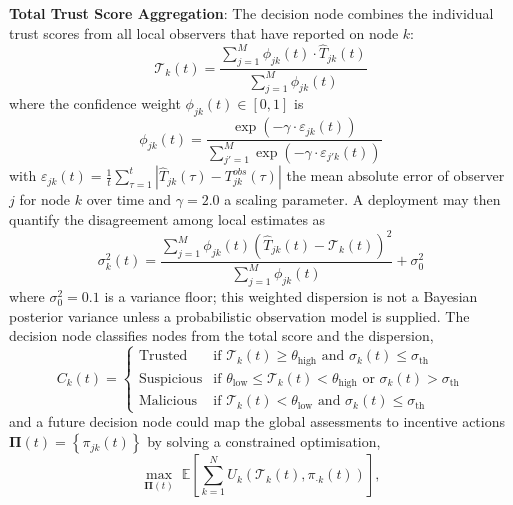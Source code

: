 \documentclass[notspecified,article,submit,moreauthors]{Definitions/mdpi}
\begin{document}
\textbf{Total Trust Score Aggregation}: The decision node combines the individual trust scores from all local observers that have reported on node $k$:
\begin{equation}\label{eq:ida_global}
\mathcal{T}_k(t) = \frac{\sum_{j=1}^{M} \phi_{jk}(t) \cdot \hat{T}_{jk}(t)}{\sum_{j=1}^{M} \phi_{jk}(t)}
\end{equation}
where the confidence weight $\phi_{jk}(t) \in [0, 1]$ is
\begin{equation}\label{eq:ida_weight}
\phi_{jk}(t) = \frac{\exp\left(-\gamma \cdot \varepsilon_{jk}(t)\right)}{\sum_{j'=1}^{M} \exp\left(-\gamma \cdot \varepsilon_{j'k}(t)\right)}
\end{equation}
with $\varepsilon_{jk}(t) = \frac{1}{t} \sum_{\tau=1}^{t} \left| \hat{T}_{jk}(\tau) - T_{jk}^{obs}(\tau) \right|$ the mean absolute error of observer $j$ for node $k$ over time and $\gamma = 2.0$ a scaling parameter. A deployment may then quantify the disagreement among local estimates as
\begin{equation}\label{eq:ida_uncertainty}
\sigma_k^2(t) = \frac{\sum_{j=1}^{M} \phi_{jk}(t) \left( \hat{T}_{jk}(t) - \mathcal{T}_k(t) \right)^2}{\sum_{j=1}^{M} \phi_{jk}(t)} + \sigma_0^2
\end{equation}
where $\sigma_0^2 = 0.1$ is a variance floor; this weighted dispersion is not a Bayesian posterior variance unless a probabilistic observation model is supplied. The decision node classifies nodes from the total score and the dispersion,
\begin{equation}\label{eq:ida_classification}
C_k(t) =
\begin{cases}
\text{Trusted} & \text{if } \mathcal{T}_k(t) \geq \theta_{\text{high}} \text{ and } \sigma_k(t) \leq \sigma_{\text{th}} \\
\text{Suspicious} & \text{if } \theta_{\text{low}} \leq \mathcal{T}_k(t) < \theta_{\text{high}} \text{ or } \sigma_k(t) > \sigma_{\text{th}} \\
\text{Malicious} & \text{if } \mathcal{T}_k(t) < \theta_{\text{low}} \text{ and } \sigma_k(t) \leq \sigma_{\text{th}}
\end{cases}
\end{equation}
and a future decision node could map the global assessments to incentive actions $\boldsymbol{\Pi}(t) = \left\{ \pi_{jk}(t) \right\}$ by solving a constrained optimisation,
\begin{equation}\label{eq:incentive_opt}
\max_{\boldsymbol{\Pi}(t)}\; \mathbb{E}\left[ \sum_{k=1}^{N} U_k\!\left( \mathcal{T}_k(t), \pi_{\cdot k}(t) \right) \right],
\end{equation}
\end{document}

